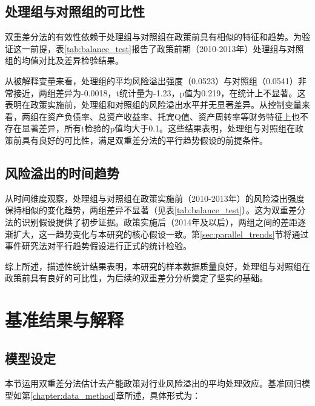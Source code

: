
\subsection{处理组与对照组的可比性}

双重差分法的有效性依赖于处理组与对照组在政策前具有相似的特征和趋势。为验证这一前提，表\ref{tab:balance_test}报告了政策前期（2010-2013年）处理组与对照组的均值对比及差异检验结果。

从被解释变量来看，处理组的平均风险溢出强度（0.0523）与对照组（0.0541）非常接近，两组差异为-0.0018，t统计量为-1.23，p值为0.219，在统计上不显著。这表明在政策实施前，处理组和对照组的风险溢出水平并无显著差异。从控制变量来看，两组在资产负债率、总资产收益率、托宾Q值、资产周转率等财务特征上也不存在显著差异，所有t检验的p值均大于0.1。这些结果表明，处理组与对照组在政策前具有良好的可比性，满足双重差分法的平行趋势假设的前提条件。


\subsection{风险溢出的时间趋势}

从时间维度观察，处理组与对照组在政策实施前（2010-2013年）的风险溢出强度保持相似的变化趋势，两组差异不显著（见表\ref{tab:balance_test}）。这为双重差分法的识别假设提供了初步证据。政策实施后（2014年及以后），两组之间的差距逐渐扩大，这一趋势变化与本研究的核心假设一致。第\ref{sec:parallel_trends}节将通过事件研究法对平行趋势假设进行正式的统计检验。

综上所述，描述性统计结果表明，本研究的样本数据质量良好，处理组与对照组在政策前具有良好的可比性，为后续的双重差分分析奠定了坚实的基础。


\section{基准结果与解释}
\label{sec:baseline_did}

\subsection{模型设定}

本节运用双重差分法估计去产能政策对行业风险溢出的平均处理效应。基准回归模型如第\ref{chapter:data_method}章所述，具体形式为：

